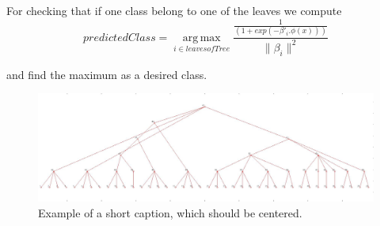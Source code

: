 \documentclass[10pt,twocolumn,letterpaper]{article}
\begin{document}
For checking that if one class belong to one of the leaves we compute 
\begin{displaymath}
predictedClass = \operatorname*{arg\,max}_{i \in leaves of Tree} 
\frac{\frac{1}{(1+exp(-\beta'_i.\phi(x)))}}{\|\beta_i\|^2}
\end{displaymath}  

and find the maximum as a desired class.


\begin{figure}
	\begin{center}
	    \includegraphics[width=1\linewidth]{carsDogs.png}
	\end{center}
	\caption{Example of a short caption, which should be centered.}
	\label{fig:short}
\end{figure}
{\small


}
\end{document}
